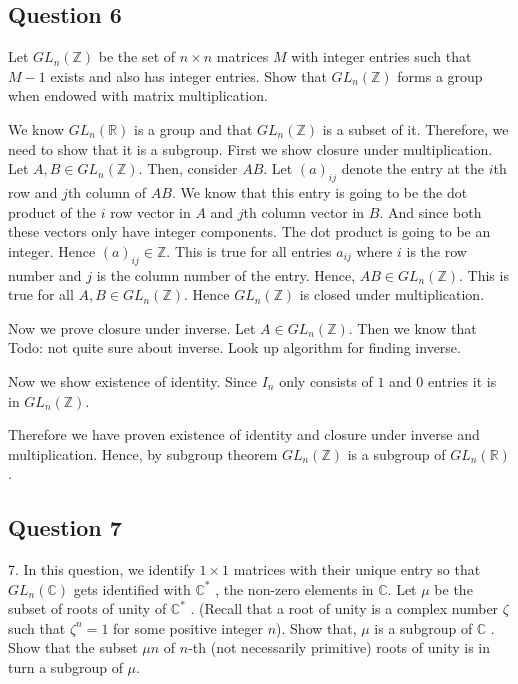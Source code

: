 \subsection{Question 6}
Let \( GL_{n}\left( \mathbb{Z} \right) \) be the set of \( n \times n \) matrices \( M \) with integer entries such that \( M -1 \) exists and also
has integer entries. Show that \( GL_{n}\left( \mathbb{Z} \right) \) forms a group when endowed with matrix multiplication.

\begin{solution}
 We know \(GL_{n}\left( \mathbb{R} \right)  \) is a group and that \( GL_{n}\left( \mathbb{Z} \right) \) is a subset of it. Therefore, we need to show
 that it is a subgroup.
 First we show closure under multiplication. Let \( A,B \in GL_{n}\left( \mathbb{Z} \right) \). Then, consider \( AB \).
 Let \( \left( a \right)_{ij} \) denote the entry at the \( i \)th row and \( j \)th column of \( AB \). 
 We know that this entry is going to be the dot product of the \( i \) row vector in \( A \) and
 \( j \)th column vector in \( B \). And since both these vectors only have integer components.
 The dot product is going to be an integer. Hence \( \left( a \right)_{ij} \in \mathbb{Z} \). This
 is true for all entries \( a_{ij} \) where \( i \) is the row number and \( j \) is the column number of the entry.
 Hence, \( AB \in GL_{n}\left( \mathbb{Z} \right)\). This is true for all \( A,B \in GL_{n}\left( \mathbb{Z} \right) \). Hence \( GL_{n}\left( \mathbb{Z} \right) \)
 is closed under multiplication.

 Now we prove closure under inverse. Let \( A \in GL_{n}\left( \mathbb{Z} \right) \). Then we know that 
 Todo: not quite sure about inverse. Look up algorithm for finding inverse.

 Now we show existence of identity. Since \( I_{n} \) only consists of \( 1  \) and 0 entries it is in \( GL_{n}\left( \mathbb{Z} \right) \).
 
 Therefore we have proven existence of identity and closure under inverse and multiplication. 
 Hence, by subgroup theorem \( GL_{n}\left( \mathbb{Z} \right) \) is a subgroup of \( GL_{n} \left( \mathbb{R} \right) \).
\end{solution}

\subsection{Question 7}
7. In this question, we identify \( 1 \times  1 \) matrices with their unique entry so that \( GL_{n}\left( \mathbb{C} \right) \) gets
identified with \( \mathbb{C}^{*} \) , the non-zero elements in \( \mathbb{C} \). Let \( \mu  \) be the subset of roots of unity of \( \mathbb{C}^{*} \) .
(Recall that a root of unity is a complex number \( \zeta \) such that \( \zeta^{n} = 1 \) for some positive integer \( n \)).
Show that, \( \mu  \) is a subgroup of \( \mathbb{C} \) . Show that the subset \( \mu n \) of \( n \)-th (not necessarily primitive)
roots of unity is in turn a subgroup of \( \mu  \).

